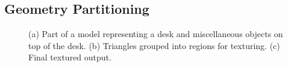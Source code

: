 \documentclass[]{spie}  %
\begin{document}
\subsection{Geometry Partitioning}
\label{sec:geometryPartitioning}

\begin{figure}
  \centering
  \hspace{0.5in}
  \hspace{0.5in}
  \caption{(a) Part of a model representing a desk and miscellaneous
    objects on top of the desk. (b) Triangles grouped into regions for
    texturing. (c) Final textured output.}
  \label{fig:deskGeom}
\end{figure}
\end{document}

